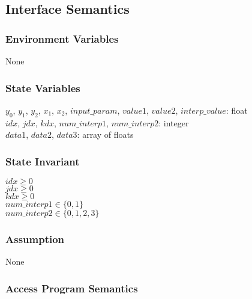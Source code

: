 \documentclass[12pt]{article}
\begin{document}
\subsection{Interface Semantics}

\subsubsection{Environment Variables}

None

\subsubsection{State Variables}

$y_{0}$, $y_{1}$, $y_{2}$, $x_{1}$, $x_{2}$, $input\_param$, $value1$, $value2$, $interp\_value$: float \\
$idx$, $jdx$, $kdx$, $num\_interp1$, $num\_interp2$: integer \\
$data1$, $data2$, $data3$: array of floats

\subsubsection{State Invariant}

$idx \geq 0$ \\
$jdx \geq 0$ \\
$kdx \geq 0$ \\
$num\_interp1 \in \{0, 1\}$ \\
$num\_interp2 \in \{0, 1, 2, 3\}$

\subsubsection{Assumption}

None

\subsubsection{Access Program Semantics}
\end{document}

